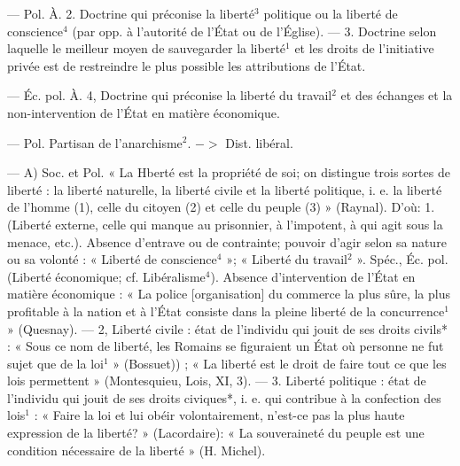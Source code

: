 \begin{itemize}[leftmargin=1cm, label=, itemsep=1pt]
— Pol. À. 2. Doctrine qui préconise la liberté$^3$ politique ou la liberté
de conscience$^4$ (par opp. à l'autorité
de l'État ou de l'Église). — 3. Doctrine selon laquelle le meilleur
moyen de sauvegarder la liberté$^1$ et
les droits de l'initiative privée est
de restreindre le plus possible les
attributions de l’État.

— Éc. pol. À. 4, Doctrine qui préconise la liberté du travail$^2$ et des
échanges et la non-intervention de
l'État en matière économique.

 — Pol. Partisan de l’anarchisme$^2$. $->$ Dist. libéral.

 — A) Soc. et Pol. « La Hberté
est la propriété de soi; on distingue
trois sortes de liberté : la liberté
naturelle, la liberté civile et la
liberté politique, i. e. la liberté de
l’homme (1), celle du citoyen (2) et
celle du peuple (3) » (Raynal). D'où:
1. (Liberté externe, celle qui manque
au prisonnier, à l’impotent, à qui
agit sous la menace, etc.). Absence
d’entrave ou de contrainte; pouvoir
d’agir selon sa nature ou sa volonté :
« Liberté de conscience$^4$ »; « Liberté
du travail$^2$ ». Spéc., Éc. pol. (Liberté
économique; cf. Libéralisme$^4$).
Absence d'intervention de l'État en
matière économique : « La police
[organisation] du commerce la plus
sûre, la plus profitable à la nation
et à l'État consiste dans la pleine
liberté de la concurrence$^1$ » (Quesnay). — 2, Liberté civile : état de
l'individu qui jouit de ses droits
civils* : « Sous ce nom de liberté,
les Romains se figuraient un État
où personne ne fut sujet que de la
loi$^1$ » (Bossuet)) ; « La liberté est le
droit de faire tout ce que les lois
permettent » (Montesquieu, Lois,
XI, 3). — 3. Liberté politique : état de
l'individu qui jouit de ses droits
civiques*, i. e. qui contribue à la
confection des lois$^1$ : « Faire la loi
et lui obéir volontairement, n'est-ce
pas la plus haute expression de la
liberté? » (Lacordaire): « La souveraineté du peuple est une condition
nécessaire de la liberté » (H. Michel).


\end{itemize}
